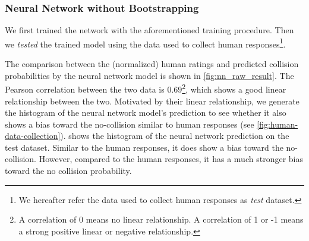 
\subsubsection{Neural Network without Bootstrapping}
We first trained the network with the aforementioned training procedure.
Then we \textit{tested} the trained model using the data used to collect human responses\footnote{We hereafter refer the data used to collect human responses as \textit{test} dataset.}.

The comparison between the (normalized) human ratings and predicted collision probabilities by the neural network model is shown in \cref{fig:nn_raw_result}.
The Pearson correlation between the two data is $0.69$\footnote{A correlation of 0 means no linear relationship. A correlation of 1 or -1 means a strong positive linear or negative relationship.}, which shows a good linear relationship between the two. Motivated by their linear relationship, we generate the histogram of the neural network model's prediction to see whether it also shows a bias toward the no-collision similar to human responses (see \cref{fig:human-data-collection}).
 shows the histogram of the neural network prediction on the test dataset. Similar to the human responses, it does show a bias toward the no-collision. 
However, compared to the human responses, it has a much stronger bias toward the no collision probability. 

